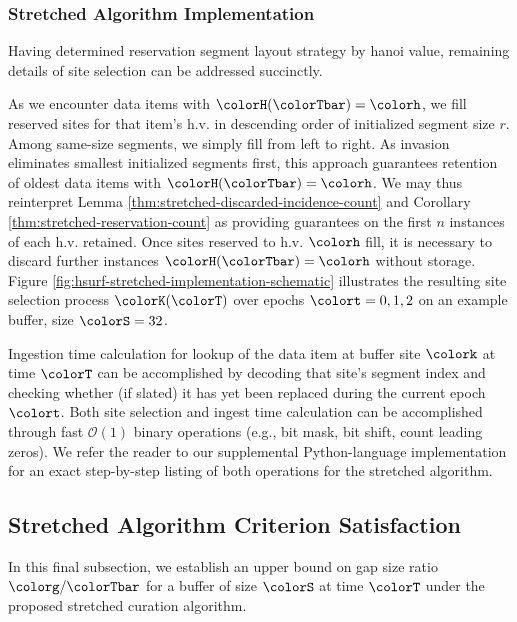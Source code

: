 


\subsubsection{Stretched Algorithm Implementation}
\label{sec:stretched-implementation}

Having determined reservation segment layout strategy by hanoi value, remaining details of site selection can be addressed succinctly.

As we encounter data items with $\colorH(\colorTbar) = \colorh$, we fill reserved sites for that item's h.v. in descending order of initialized segment size $r$.
Among same-size segments, we simply fill from left to right.
As invasion eliminates smallest initialized segments first, this approach guarantees retention of oldest data items with $\colorH(\colorTbar) = \colorh$.
We may thus reinterpret Lemma \ref{thm:stretched-discarded-incidence-count} and Corollary \ref{thm:stretched-reservation-count} as providing guarantees on the first $n$ instances of each h.v. retained.
Once sites reserved to h.v. $\colorh$ fill, it is necessary to discard further instances $\colorH(\colorTbar) = \colorh$ without storage.
Figure \ref{fig:hsurf-stretched-implementation-schematic} illustrates the resulting site selection process $\colorK(\colorT)$ over epochs $\colort=0,1,2$ on an example buffer, size $\colorS=32$.

Ingestion time calculation for lookup of the data item at buffer site $\colork$ at time $\colorT$ can be accomplished by decoding that site's segment index and checking whether (if slated) it has yet been replaced during the current epoch $\colort$.
Both site selection and ingest time calculation can be accomplished through fast $\mathcal{O}(1)$ binary operations (e.g., bit mask, bit shift, count leading zeros).
We refer the reader to our supplemental Python-language implementation for an exact step-by-step listing of both operations for the stretched algorithm.

\subsection{Stretched Algorithm Criterion Satisfaction}
\label{sec:stretched-satisfaction}

In this final subsection, we establish an upper bound on gap size ratio $\colorg / \colorTbar$ for a buffer of size $\colorS$ at time $\colorT$ under the proposed stretched curation algorithm.

